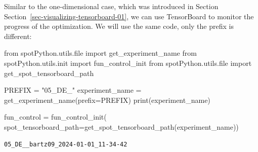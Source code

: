 \documentclass[
  letterpaper,
  DIV=11,
  numbers=noendperiod]{scrreprt}
\newenvironment{Shaded}{\begin{snugshade}}{\end{snugshade}}
\newcommand{\BuiltInTok}[1]{\textcolor[rgb]{0.00,0.23,0.31}{#1}}
\newcommand{\ImportTok}[1]{\textcolor[rgb]{0.00,0.46,0.62}{#1}}
\newcommand{\NormalTok}[1]{\textcolor[rgb]{0.00,0.23,0.31}{#1}}
\newcommand{\OperatorTok}[1]{\textcolor[rgb]{0.37,0.37,0.37}{#1}}
\newcommand{\StringTok}[1]{\textcolor[rgb]{0.13,0.47,0.30}{#1}}
\begin{document}
\begin{tcolorbox}[enhanced jigsaw, opacityback=0, left=2mm, title=\textcolor{quarto-callout-note-color}{\faInfo}\hspace{0.5em}{TensorBoard}, bottomrule=.15mm, titlerule=0mm, arc=.35mm, leftrule=.75mm, colbacktitle=quarto-callout-note-color!10!white, bottomtitle=1mm, opacitybacktitle=0.6, coltitle=black, colframe=quarto-callout-note-color-frame, toprule=.15mm, breakable, colback=white, toptitle=1mm, rightrule=.15mm]

Similar to the one-dimensional case, which was introduced in Section
Section~\ref{sec-visualizing-tensorboard-01}, we can use TensorBoard to
monitor the progress of the optimization. We will use the same code,
only the prefix is different:

\begin{Shaded}
\begin{Highlighting}[]
\ImportTok{from}\NormalTok{ spotPython.utils.}\BuiltInTok{file} \ImportTok{import}\NormalTok{ get\_experiment\_name}
\ImportTok{from}\NormalTok{ spotPython.utils.init }\ImportTok{import}\NormalTok{ fun\_control\_init}
\ImportTok{from}\NormalTok{ spotPython.utils.}\BuiltInTok{file} \ImportTok{import}\NormalTok{ get\_spot\_tensorboard\_path}

\NormalTok{PREFIX }\OperatorTok{=} \StringTok{"05\_DE\_"}
\NormalTok{experiment\_name }\OperatorTok{=}\NormalTok{ get\_experiment\_name(prefix}\OperatorTok{=}\NormalTok{PREFIX)}
\BuiltInTok{print}\NormalTok{(experiment\_name)}

\NormalTok{fun\_control }\OperatorTok{=}\NormalTok{ fun\_control\_init(}
\NormalTok{    spot\_tensorboard\_path}\OperatorTok{=}\NormalTok{get\_spot\_tensorboard\_path(experiment\_name))}
\end{Highlighting}
\end{Shaded}

\begin{verbatim}
05_DE__bartz09_2024-01-01_11-34-42
\end{verbatim}

\end{tcolorbox}
\end{document}

